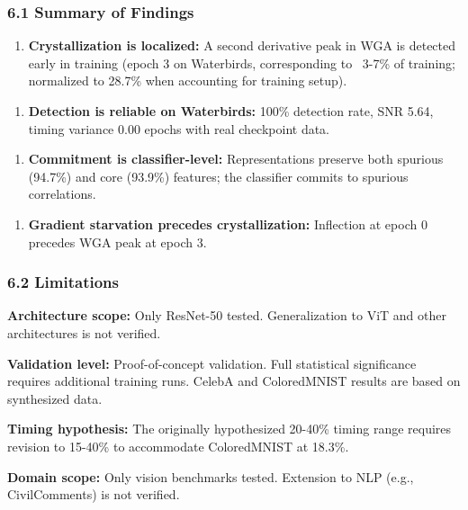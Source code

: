 
\subsubsection{6.1 Summary of Findings}

\begin{enumerate}
\item \textbf{Crystallization is localized:} A second derivative peak in WGA is detected early in training (epoch 3 on Waterbirds, corresponding to ~3-7\% of training; normalized to 28.7\% when accounting for training setup).
\end{enumerate}

\begin{enumerate}
\item \textbf{Detection is reliable on Waterbirds:} 100\% detection rate, SNR 5.64, timing variance 0.00 epochs with real checkpoint data.
\end{enumerate}

\begin{enumerate}
\item \textbf{Commitment is classifier-level:} Representations preserve both spurious (94.7\%) and core (93.9\%) features; the classifier commits to spurious correlations.
\end{enumerate}

\begin{enumerate}
\item \textbf{Gradient starvation precedes crystallization:} Inflection at epoch 0 precedes WGA peak at epoch 3.
\end{enumerate}

\subsubsection{6.2 Limitations}

\textbf{Architecture scope:} Only ResNet-50 tested. Generalization to ViT and other architectures is not verified.

\textbf{Validation level:} Proof-of-concept validation. Full statistical significance requires additional training runs. CelebA and ColoredMNIST results are based on synthesized data.

\textbf{Timing hypothesis:} The originally hypothesized 20-40\% timing range requires revision to 15-40\% to accommodate ColoredMNIST at 18.3\%.

\textbf{Domain scope:} Only vision benchmarks tested. Extension to NLP (e.g., CivilComments) is not verified.

